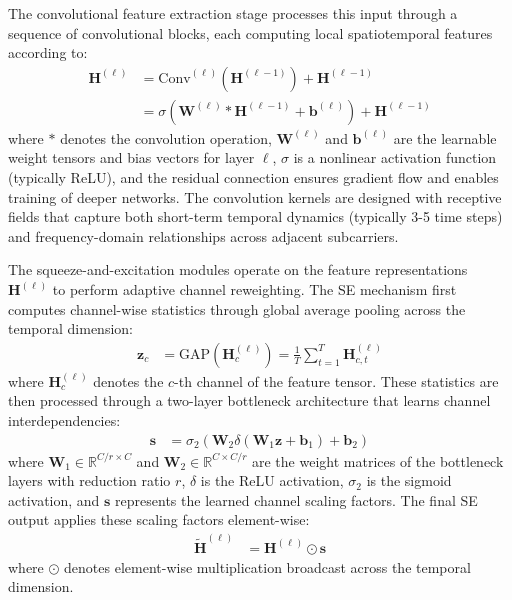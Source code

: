 \documentclass[journal]{IEEEtran}
\begin{document}
The convolutional feature extraction stage processes this input through a sequence of convolutional blocks, each computing local spatiotemporal features according to:
\begin{align}
\mathbf{H}^{(\ell)} &= \mathrm{Conv}^{(\ell)}(\mathbf{H}^{(\ell-1)}) + \mathbf{H}^{(\ell-1)} \\
&= \sigma(\mathbf{W}^{(\ell)} * \mathbf{H}^{(\ell-1)} + \mathbf{b}^{(\ell)}) + \mathbf{H}^{(\ell-1)}
\end{align}
where $*$ denotes the convolution operation, $\mathbf{W}^{(\ell)}$ and $\mathbf{b}^{(\ell)}$ are the learnable weight tensors and bias vectors for layer $\ell$, $\sigma$ is a nonlinear activation function (typically ReLU), and the residual connection ensures gradient flow and enables training of deeper networks. The convolution kernels are designed with receptive fields that capture both short-term temporal dynamics (typically 3-5 time steps) and frequency-domain relationships across adjacent subcarriers.

The squeeze-and-excitation modules operate on the feature representations $\mathbf{H}^{(\ell)}$ to perform adaptive channel reweighting. The SE mechanism first computes channel-wise statistics through global average pooling across the temporal dimension:
\begin{align}
\mathbf{z}_c &= \mathrm{GAP}(\mathbf{H}^{(\ell)}_c) = \frac{1}{T} \sum_{t=1}^{T} \mathbf{H}^{(\ell)}_{c,t}
\end{align}
where $\mathbf{H}^{(\ell)}_c$ denotes the $c$-th channel of the feature tensor. These statistics are then processed through a two-layer bottleneck architecture that learns channel interdependencies:
\begin{align}
\mathbf{s} &= \sigma_2(\mathbf{W}_2 \delta(\mathbf{W}_1 \mathbf{z} + \mathbf{b}_1) + \mathbf{b}_2)
\end{align}
where $\mathbf{W}_1 \in \mathbb{R}^{C/r \times C}$ and $\mathbf{W}_2 \in \mathbb{R}^{C \times C/r}$ are the weight matrices of the bottleneck layers with reduction ratio $r$, $\delta$ is the ReLU activation, $\sigma_2$ is the sigmoid activation, and $\mathbf{s}$ represents the learned channel scaling factors. The final SE output applies these scaling factors element-wise:
\begin{align}
\tilde{\mathbf{H}}^{(\ell)} &= \mathbf{H}^{(\ell)} \odot \mathbf{s}
\end{align}
where $\odot$ denotes element-wise multiplication broadcast across the temporal dimension.
\end{document}
